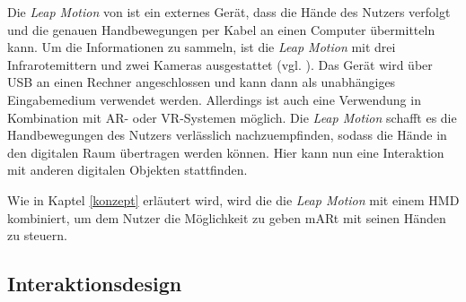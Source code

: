 Die \textit{Leap Motion} von \cite{leapMotion} ist ein externes Gerät, dass die Hände des Nutzers verfolgt und die genauen Handbewegungen per Kabel an einen Computer übermitteln kann. 
Um die Informationen zu sammeln, ist die \textit{Leap Motion} mit drei Infrarotemittern und zwei Kameras ausgestattet (vgl. \cite{Weichert13}). Das Gerät wird über USB an einen Rechner angeschlossen und kann dann als unabhängiges Eingabemedium verwendet werden. Allerdings ist auch eine Verwendung in Kombination mit AR- oder VR-Systemen möglich. 
Die \textit{Leap Motion} schafft es die Handbewegungen des Nutzers verlässlich nachzuempfinden, sodass die Hände in den digitalen Raum übertragen werden können. Hier kann nun eine Interaktion mit anderen digitalen Objekten stattfinden. 

Wie in Kaptel \ref{konzept} erläutert wird, wird die die \textit{Leap Motion} mit einem HMD kombiniert, um dem Nutzer die Möglichkeit zu geben mARt mit seinen Händen zu steuern.

\subsection{Interaktionsdesign}








